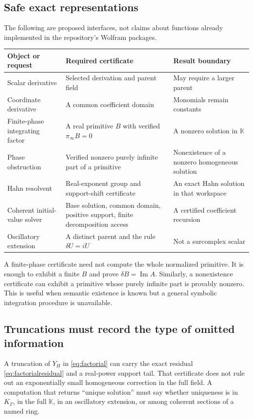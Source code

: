 \documentclass[11pt,letterpaper]{article}
\numberwithin{equation}{section}
\theoremstyle{definition}
\theoremstyle{remark}
\newcommand{\K}{\mathbb K}
\newcommand{\im}{\operatorname{Im}}
\begin{document}
\subsection{Safe exact representations}
The following are proposed interfaces, not claims about functions already implemented in the repository's Wolfram packages.
\begin{center}\small
\begin{tabular}{L{0.27\textwidth}L{0.35\textwidth}L{0.27\textwidth}}
\toprule
Object or request & Required certificate & Result boundary\\
\midrule
Scalar derivative & Selected derivation and parent field & May require a larger parent\\
Coordinate derivative & A common coefficient domain & Monomials remain constants\\
Finite-phase integrating factor & A real primitive $B$ with verified $\pi_\infty B=0$ & A nonzero solution in $\K$\\
Phase obstruction & Verified nonzero purely infinite part of a primitive & Nonexistence of a nonzero homogeneous solution\\
Hahn resolvent & Real-exponent group and support-shift certificate & An exact Hahn solution in that workspace\\
Coherent initial-value solver & Base solution, common domain, positive support, finite decomposition access & A certified coefficient recursion\\
Oscillatory extension & A distinct parent and the rule $\delta U=iU$ & Not a surcomplex scalar\\
\bottomrule
\end{tabular}
\end{center}

A finite-phase certificate need not compute the whole normalized primitive. It is enough to exhibit a finite $B$ and prove $\delta B=\im A$. Similarly, a nonexistence certificate can exhibit a primitive whose purely infinite part is provably nonzero. This is useful when semantic existence is known but a general symbolic integration procedure is unavailable.

\subsection{Truncations must record the type of omitted information}
A truncation of $Y_H$ in \eqref{eq:factorial} can carry the exact residual \eqref{eq:factorialresidual} and a real-power support tail. That certificate does not rule out an exponentially small homogeneous correction in the full field. A computation that returns ``unique solution'' must say whether uniqueness is in $K_\Gamma$, in the full $\K$, in an oscillatory extension, or among coherent sections of a named ring.
\end{document}

